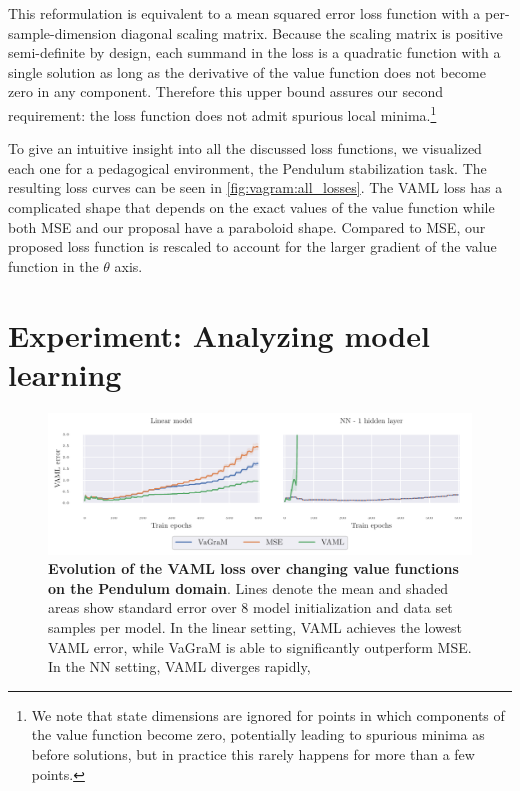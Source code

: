 This reformulation is equivalent to a mean squared error loss function with a per-sample-dimension diagonal scaling matrix.
Because the scaling matrix is positive semi-definite by design, each summand in the loss is a quadratic function with a single solution as long as the derivative of the value function does not become zero in any component.
Therefore this upper bound assures our second requirement: the loss function does not admit spurious local minima.\footnote{We note that state dimensions are ignored for points in which components of the value function become zero, potentially leading to spurious minima as before solutions, but in practice this rarely happens for more than a few points.}

To give an intuitive insight into all the discussed loss functions, we visualized each one for a pedagogical environment, the Pendulum stabilization task.
The resulting loss curves can be seen in \autoref{fig:vagram:all_losses}.
The VAML loss has a complicated shape that depends on the exact values of the value function while both MSE and our proposal have a paraboloid shape.
Compared to MSE, our proposed loss function is rescaled to account for the larger gradient of the value function in the $\theta$ axis.

\section{Experiment: Analyzing model learning}
\label{sec:vagram:experiments}

\begin{figure}[t]
\begin{center}
\includegraphics[width=\linewidth]{figures/vagram/pendulum_joint.pdf}
\end{center}
\caption{\textbf{Evolution of the VAML loss over changing value functions on the Pendulum domain}. Lines denote the mean and shaded areas show standard error over 8 model initialization and data set samples per model. In the linear setting, VAML achieves the lowest VAML error, while VaGraM is able to significantly outperform MSE. In the NN setting, VAML diverges rapidly, }
\label{fig:vagram:iterated_pendulum_training}
\end{figure}

